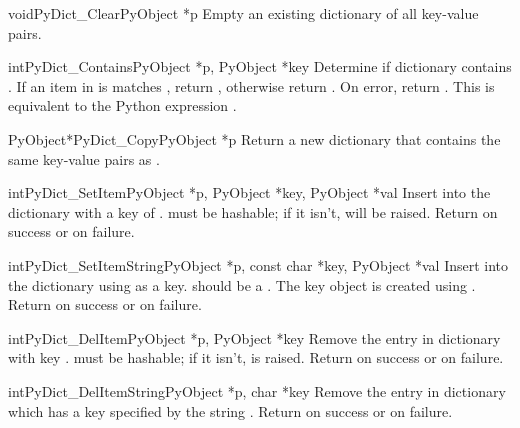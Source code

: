 \begin{cfuncdesc}{void}{PyDict_Clear}{PyObject *p}
  Empty an existing dictionary of all key-value pairs.
\end{cfuncdesc}

\begin{cfuncdesc}{int}{PyDict_Contains}{PyObject *p, PyObject *key}
  Determine if dictionary  contains .  If an item
  in  is matches , return , otherwise return
  .  On error, return .  This is equivalent to the
  Python expression .
\end{cfuncdesc}

\begin{cfuncdesc}{PyObject*}{PyDict_Copy}{PyObject *p}
  Return a new dictionary that contains the same key-value pairs as
  .
\end{cfuncdesc}

\begin{cfuncdesc}{int}{PyDict_SetItem}{PyObject *p, PyObject *key,
                                       PyObject *val}
  Insert  into the dictionary  with a key of
  .   must be hashable; if it isn't,
   will be raised.
  Return  on success or  on failure.
\end{cfuncdesc}

\begin{cfuncdesc}{int}{PyDict_SetItemString}{PyObject *p,
            const char *key,
            PyObject *val}
  Insert  into the dictionary  using  as a
  key.  should be a .  The key object is created
  using . Return  on
  success or  on failure.
\end{cfuncdesc}

\begin{cfuncdesc}{int}{PyDict_DelItem}{PyObject *p, PyObject *key}
  Remove the entry in dictionary  with key .
   must be hashable; if it isn't,  is
  raised.  Return  on success or  on failure.
\end{cfuncdesc}

\begin{cfuncdesc}{int}{PyDict_DelItemString}{PyObject *p, char *key}
  Remove the entry in dictionary  which has a key specified by
  the string .  Return  on success or  on
  failure.
\end{cfuncdesc}

